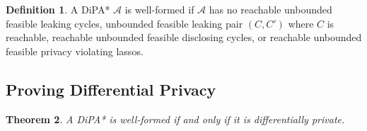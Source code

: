 \documentclass[12pt]{article}
\newtheorem{thm}{Theorem}[section]
\theoremstyle{definition}
\newtheorem{defn}[thm]{Definition}
\begin{document}
\begin{defn} 
	A DiPA* $\mathcal{A}$ is well-formed if $\mathcal{A}$ has no reachable unbounded feasible leaking cycles, unbounded feasible leaking pair $(C, C')$ where $C$ is reachable, reachable unbounded feasible disclosing cycles, or reachable unbounded feasible privacy violating lassos.
\end{defn}




\subsection{Proving Differential Privacy}

\begin{thm}\label{DPtheorem}
	A DiPA* is well-formed if and only if it is differentially private.
\end{thm}
\end{document}
